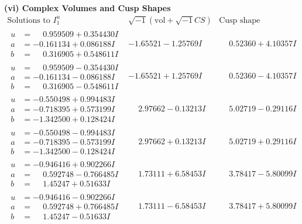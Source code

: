 \documentclass[1p]{elsarticle_modified}
\theoremstyle{definition}
\newcommand{\I}{\sqrt{-1}}
\begin{document}
\newpage\flushleft \textbf{(vi) Complex Volumes and Cusp Shapes}
$$\begin{array}{c|c|c}  
\text{Solutions to }I^u_{1}& \I (\text{vol} + \sqrt{-1}CS) & \text{Cusp shape}\\
 \hline 
\begin{aligned}
u &= \phantom{-}0.959509 + 0.354430 I \\
a &= -0.161134 + 0.086188 I \\
b &= \phantom{-}0.316905 + 0.548611 I\end{aligned}
 & -1.65521 - 1.25769 I & \phantom{-}0.52360 + 4.10357 I \\ \hline\begin{aligned}
u &= \phantom{-}0.959509 - 0.354430 I \\
a &= -0.161134 - 0.086188 I \\
b &= \phantom{-}0.316905 - 0.548611 I\end{aligned}
 & -1.65521 + 1.25769 I & \phantom{-}0.52360 - 4.10357 I \\ \hline\begin{aligned}
u &= -0.550498 + 0.994483 I \\
a &= -0.718395 + 0.573199 I \\
b &= -1.342500 + 0.128424 I\end{aligned}
 & \phantom{-}2.97662 - 0.13213 I & \phantom{-}5.02719 - 0.29116 I \\ \hline\begin{aligned}
u &= -0.550498 - 0.994483 I \\
a &= -0.718395 - 0.573199 I \\
b &= -1.342500 - 0.128424 I\end{aligned}
 & \phantom{-}2.97662 + 0.13213 I & \phantom{-}5.02719 + 0.29116 I \\ \hline\begin{aligned}
u &= -0.946416 + 0.902266 I \\
a &= \phantom{-}0.592748 - 0.766485 I \\
b &= \phantom{-}1.45247 + 0.51633 I\end{aligned}
 & \phantom{-}1.73111 + 6.58453 I & \phantom{-}3.78417 - 5.80099 I \\ \hline\begin{aligned}
u &= -0.946416 - 0.902266 I \\
a &= \phantom{-}0.592748 + 0.766485 I \\
b &= \phantom{-}1.45247 - 0.51633 I\end{aligned}
 & \phantom{-}1.73111 - 6.58453 I & \phantom{-}3.78417 + 5.80099 I \\ \hline\begin{aligned}

\end{aligned}
\end{array}$$
\end{document}
